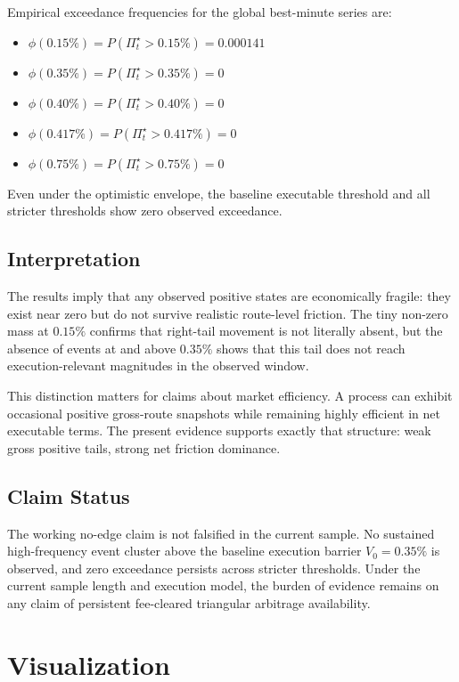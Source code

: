 \documentclass[11pt,a4paper]{article}
\begin{document}
\noindent Empirical exceedance frequencies for the global best-minute series are:
\begin{itemize}
    \item $\phi(0.15\%) = P\!\left(\Pi^{\star}_{t} > 0.15\%\right) = 0.000141$
    \item $\phi(0.35\%) = P\!\left(\Pi^{\star}_{t} > 0.35\%\right) = 0$
    \item $\phi(0.40\%) = P\!\left(\Pi^{\star}_{t} > 0.40\%\right) = 0$
    \item $\phi(0.417\%) = P\!\left(\Pi^{\star}_{t} > 0.417\%\right) = 0$
    \item $\phi(0.75\%) = P\!\left(\Pi^{\star}_{t} > 0.75\%\right) = 0$
\end{itemize}
Even under the optimistic envelope, the baseline executable threshold and all stricter thresholds show zero observed exceedance.

\subsection{Interpretation}
The results imply that any observed positive states are economically fragile: they exist near zero but do not survive realistic route-level friction. The tiny non-zero mass at $0.15\%$ confirms that right-tail movement is not literally absent, but the absence of events at and above $0.35\%$ shows that this tail does not reach execution-relevant magnitudes in the observed window.

This distinction matters for claims about market efficiency. A process can exhibit occasional positive gross-route snapshots while remaining highly efficient in net executable terms. The present evidence supports exactly that structure: weak gross positive tails, strong net friction dominance.

\subsection{Claim Status}
The working no-edge claim is not falsified in the current sample. No sustained high-frequency event cluster above the baseline execution barrier $V_0=0.35\%$ is observed, and zero exceedance persists across stricter thresholds. Under the current sample length and execution model, the burden of evidence remains on any claim of persistent fee-cleared triangular arbitrage availability.

\section{Visualization}
\end{document}
